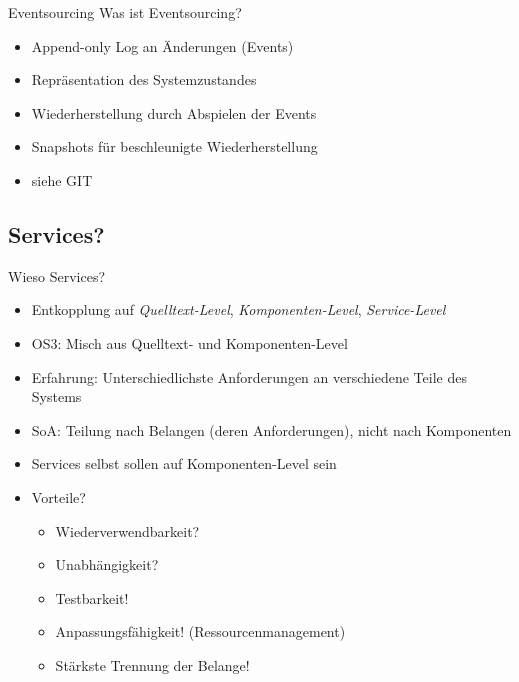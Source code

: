 \documentclass[10pt]{beamer}
\begin{document}
\begin{frame}{Eventsourcing}
	Was ist Eventsourcing?
	\begin{itemize}
		\item Append-only Log an Änderungen (Events)
		\item Repräsentation des Systemzustandes
		\item Wiederherstellung durch Abspielen der Events
		\item Snapshots für beschleunigte Wiederherstellung
		\item siehe GIT
	\end{itemize}

\end{frame}

\subsection{Services?}
\begin{frame}{Wieso Services?}
	\begin{itemize}
		\item Entkopplung auf \textit{Quelltext-Level}, \textit{Komponenten-Level}, \textit{Service-Level}
		\item OS3: Misch aus Quelltext- und Komponenten-Level
		\item Erfahrung: Unterschiedlichste Anforderungen an verschiedene Teile des Systems
		\item<2-> SoA: Teilung nach Belangen (deren Anforderungen), nicht nach Komponenten
		\item<2-> Services selbst sollen auf Komponenten-Level sein
		\item<3-> Vorteile?
		\begin{itemize}
			\item Wiederverwendbarkeit?
			\item Unabhängigkeit?
			\item<4-> Testbarkeit!
			\item<4-> Anpassungsfähigkeit! (Ressourcenmanagement)
			\item<4-> Stärkste Trennung der Belange! 
		\end{itemize}
	\end{itemize}
\end{frame}
\end{document}

